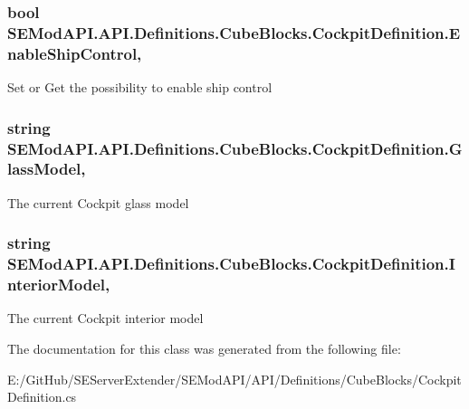 \subsubsection[{Enable\+Ship\+Control}]{\setlength{\rightskip}{0pt plus 5cm}bool S\+E\+Mod\+A\+P\+I.\+A\+P\+I.\+Definitions.\+Cube\+Blocks.\+Cockpit\+Definition.\+Enable\+Ship\+Control\hspace{0.3cm}{\ttfamily [get]}, {\ttfamily [set]}}\label{class_s_e_mod_a_p_i_1_1_a_p_i_1_1_definitions_1_1_cube_blocks_1_1_cockpit_definition_af1bb3c1c63599947d14bdef995d57787}


Set or Get the possibility to enable ship control 

\hypertarget{class_s_e_mod_a_p_i_1_1_a_p_i_1_1_definitions_1_1_cube_blocks_1_1_cockpit_definition_a164033a23db86a6c6c36b79c7cd0b650}{}
\subsubsection[{Glass\+Model}]{\setlength{\rightskip}{0pt plus 5cm}string S\+E\+Mod\+A\+P\+I.\+A\+P\+I.\+Definitions.\+Cube\+Blocks.\+Cockpit\+Definition.\+Glass\+Model\hspace{0.3cm}{\ttfamily [get]}, {\ttfamily [set]}}\label{class_s_e_mod_a_p_i_1_1_a_p_i_1_1_definitions_1_1_cube_blocks_1_1_cockpit_definition_a164033a23db86a6c6c36b79c7cd0b650}


The current Cockpit glass model 

\hypertarget{class_s_e_mod_a_p_i_1_1_a_p_i_1_1_definitions_1_1_cube_blocks_1_1_cockpit_definition_a5d55b516dd21fcb0e68d7e568eb4114a}{}
\subsubsection[{Interior\+Model}]{\setlength{\rightskip}{0pt plus 5cm}string S\+E\+Mod\+A\+P\+I.\+A\+P\+I.\+Definitions.\+Cube\+Blocks.\+Cockpit\+Definition.\+Interior\+Model\hspace{0.3cm}{\ttfamily [get]}, {\ttfamily [set]}}\label{class_s_e_mod_a_p_i_1_1_a_p_i_1_1_definitions_1_1_cube_blocks_1_1_cockpit_definition_a5d55b516dd21fcb0e68d7e568eb4114a}


The current Cockpit interior model 



The documentation for this class was generated from the following file\+:\begin{DoxyCompactItemize}
\item 
E\+:/\+Git\+Hub/\+S\+E\+Server\+Extender/\+S\+E\+Mod\+A\+P\+I/\+A\+P\+I/\+Definitions/\+Cube\+Blocks/Cockpit\+Definition.\+cs\end{DoxyCompactItemize}
